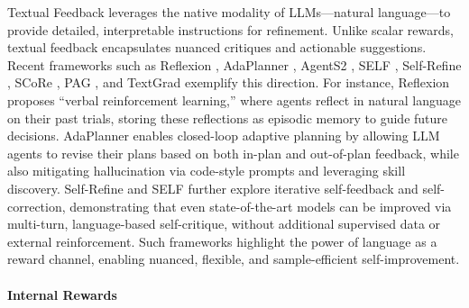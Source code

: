 \documentclass[10pt]{article} %
\begin{document}
Textual Feedback leverages the native modality of LLMs—natural language—to provide detailed, interpretable instructions for refinement. Unlike scalar rewards, textual feedback encapsulates nuanced critiques and actionable suggestions. Recent frameworks such as Reflexion \citep{shinn2023reflexion}, AdaPlanner \citep{sun2023adaplanner}, AgentS2 \citep{agashe2025agents2}, SELF \citep{lu2023self}, Self-Refine \citep{madaan2023self_refine}, SCoRe \citep{kumar2024training}, PAG \citep{jiang2025pag}, and TextGrad \citep{yellamraju2024textgrad} exemplify this direction. For instance, Reflexion proposes “verbal reinforcement learning,” where agents reflect in natural language on their past trials, storing these reflections as episodic memory to guide future decisions. AdaPlanner enables closed-loop adaptive planning by allowing LLM agents to revise their plans based on both in-plan and out-of-plan feedback, while also mitigating hallucination via code-style prompts and leveraging skill discovery. Self-Refine and SELF further explore iterative self-feedback and self-correction, demonstrating that even state-of-the-art models can be improved via multi-turn, language-based self-critique, without additional supervised data or external reinforcement. Such frameworks highlight the power of language as a reward channel, enabling nuanced, flexible, and sample-efficient self-improvement.


\paragraph{Internal Rewards}
\end{document}

